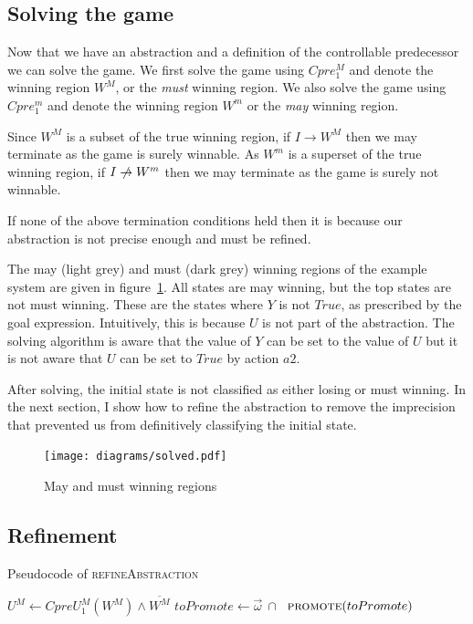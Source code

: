 \subsection{Solving the game}

Now that we have an abstraction and a definition of the controllable predecessor we can solve the game. We first solve the game using $Cpre_1^M$ and denote the winning region $W^M$, or the \emph{must} winning region. We also solve the game using $Cpre_1^m$ and denote the winning region $W^m$ or the \emph{may} winning region.

Since $W^M$ is a subset of the true winning region, if $I \rightarrow W^M$ then we may terminate as the game is surely winnable. As $W^m$ is a superset of the true winning region, if $I \centernot\rightarrow W^m$ then we may terminate as the game is surely not winnable.

If none of the above termination conditions held then it is because our abstraction is not precise enough and must be refined.

The may (light grey) and must (dark grey) winning regions of the example system are given in figure~\ref{fig:may_must_win}. All states are may winning, but the top states are not must winning. These are the states where $Y$ is not $True$, as prescribed by the goal expression. Intuitively, this is because $U$ is not part of the abstraction. The solving algorithm is aware that the value of $Y$ can be set to the value of $U$ but it is not aware that $U$ can be set to $True$ by action $a2$.

After solving, the initial state is not classified as either losing or must winning. In the next section, I show how to refine the abstraction to remove the imprecision that prevented us from definitively classifying the initial state. 

\begin{figure}[t]
\centering
\texttt{[image: diagrams/solved.pdf]}
\caption{May and must winning regions}
\label{fig:may_must_win}
\end{figure}

\subsection{Refinement}

\begin{algorithm}

\caption{Pseudocode of \textsc{refineAbstraction}}
\label{alg:refineAbstractionVar}

\begin{algorithmic}[1]
    \State $U^M \gets CpreU_1^M(W^M) \land \overline{W^M}$
    \State $toPromote \gets \vec{\omega}~\cap~$ \label{a:ra:extract_prime}
    \State $\Call{promote}{toPromote}$ \label{a:ra:promote}
\EndFunction
\end{algorithmic}
\end{algorithm}

